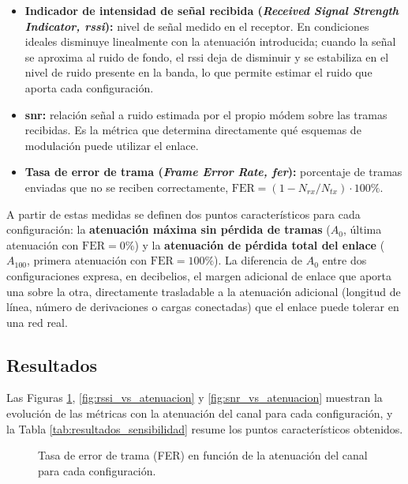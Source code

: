 \begin{itemize}
    \item \textbf{Indicador de intensidad de señal recibida (\textit{Received Signal Strength Indicator, \gls{rssi}}):} nivel de señal medido en el receptor. En condiciones ideales disminuye linealmente con la atenuación introducida; cuando la señal se aproxima al ruido de fondo, el \gls{rssi} deja de disminuir y se estabiliza en el nivel de ruido presente en la banda, lo que permite estimar el ruido que aporta cada configuración.
    \item \textbf{\gls{snr}:} relación señal a ruido estimada por el propio módem sobre las tramas recibidas. Es la métrica que determina directamente qué esquemas de modulación puede utilizar el enlace.
    \item \textbf{Tasa de error de trama (\textit{Frame Error Rate, \gls{fer}}):} porcentaje de tramas enviadas que no se reciben correctamente, $\text{FER} = \left(1 - N_{rx}/N_{tx}\right) \cdot 100\%$.
\end{itemize}

A partir de estas medidas se definen dos puntos característicos para cada configuración: la \textbf{atenuación máxima sin pérdida de tramas} ($A_{0}$, última atenuación con $\text{FER} = 0\%$) y la \textbf{atenuación de pérdida total del enlace} ($A_{100}$, primera atenuación con $\text{FER} = 100\%$). La diferencia de $A_{0}$ entre dos configuraciones expresa, en decibelios, el margen adicional de enlace que aporta una sobre la otra, directamente trasladable a la atenuación adicional (longitud de línea, número de derivaciones o cargas conectadas) que el enlace puede tolerar en una red real.

\subsection{Resultados}
\label{subsec:resultados_sensibilidad}

Las Figuras \ref{fig:fer_vs_atenuacion}, \ref{fig:rssi_vs_atenuacion} y \ref{fig:snr_vs_atenuacion} muestran la evolución de las métricas con la atenuación del canal para cada configuración, y la Tabla \ref{tab:resultados_sensibilidad} resume los puntos característicos obtenidos.

\begin{figure}[htbp]
    \centering
    \caption{Tasa de error de trama (FER) en función de la atenuación del canal para cada configuración.}
    \label{fig:fer_vs_atenuacion}
\end{figure}

